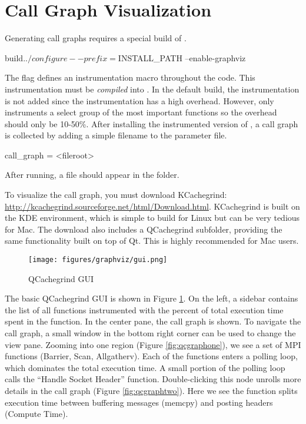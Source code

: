 

\section{Call Graph Visualization}
\label{sec:tutorials:callgraph}
Generating call graphs requires a special build of \sstmacro.

\begin{ShellCmd}
build$ ../configure --prefix=$INSTALL_PATH --enable-graphviz
\end{ShellCmd}
The  flag defines an instrumentation macro throughout the \sstmacro code.
This instrumentation must be \emph{compiled} into \sstmacro.
In the default build, the instrumentation is not added since the instrumentation has a high overhead.
However, \sstmacro only instruments a select group of the most important functions so the overhead should only be 10-50\%.
After installing the instrumented version of \sstmacro, a call graph is collected by adding a simple filename to the parameter file.

\begin{ViFile}
call_graph = <fileroot>
\end{ViFile}
After running, a  file should appear in the folder.

To visualize the call graph, you must download KCachegrind: \url{http://kcachegrind.sourceforge.net/html/Download.html}.
KCachegrind is built on the KDE environment, which is simple to build for Linux but can be very tedious for Mac.
The download also includes a QCachegrind subfolder, providing the same functionality built on top of Qt.  
This is highly recommended for Mac users.

\begin{figure}[h]
\centering
\texttt{[image: figures/graphviz/gui.png]}
\caption{QCachegrind GUI}
\label{fig:qcgui}
\end{figure}

The basic QCachegrind GUI is shown in Figure \ref{fig:qcgui}.  
On the left, a sidebar contains the list of all functions instrumented with the percent of total execution time spent in the function.
In the center pane, the call graph is shown.  
To navigate the call graph, a small window in the bottom right corner can be used to change the view pane.
Zooming into one region (Figure \ref{fig:qcgraphone}), we see a set of MPI functions (Barrier, Scan, Allgatherv).
Each of the functions enters a polling loop, which dominates the total execution time.  
A small portion of the polling loop calls the ``Handle Socket Header'' function.
Double-clicking this node unrolls more details in the call graph (Figure \ref{fig:qcgraphtwo}).
Here we see the function splits execution time between buffering messages (memcpy) and posting headers (Compute Time).


